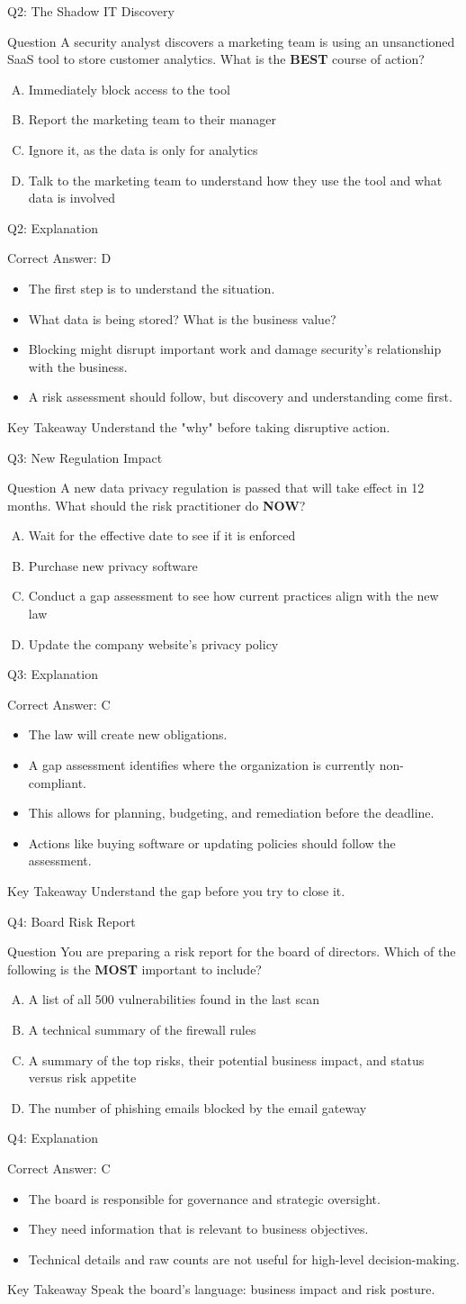 \documentclass[aspectratio=169]{beamer}
\newcommand{\hq}[7]{%
	\begin{frame}{Q#1: #2}
		\begin{block}{Question}
			#3
		\end{block}
		\begin{enumerate}[(A)]
			#4
		\end{enumerate}
	\end{frame}
	\begin{frame}{Q#1: Explanation}
		\begin{block}{Correct Answer: #5}
			\begin{itemize}
				#6
			\end{itemize}
		\end{block}
		\begin{alertblock}{Key Takeaway}
			#7
		\end{alertblock}
	\end{frame}
}
\begin{document}
	\hq{2}{The Shadow IT Discovery}
	{A security analyst discovers a marketing team is using an unsanctioned SaaS tool to store customer analytics. What is the \textbf{BEST} course of action?}
	{\item Immediately block access to the tool
		\item Report the marketing team to their manager
		\item Ignore it, as the data is only for analytics
		\item Talk to the marketing team to understand how they use the tool and what data is involved}
	{D}
	{\item The first step is to understand the situation.
		\item What data is being stored? What is the business value?
		\item Blocking might disrupt important work and damage security's relationship with the business.
		\item A risk assessment should follow, but discovery and understanding come first.}
	{Understand the "why" before taking disruptive action.}
	
	\hq{3}{New Regulation Impact}
	{A new data privacy regulation is passed that will take effect in 12 months. What should the risk practitioner do \textbf{NOW}?}
	{\item Wait for the effective date to see if it is enforced
		\item Purchase new privacy software
		\item Conduct a gap assessment to see how current practices align with the new law
		\item Update the company website's privacy policy}
	{C}
	{\item The law will create new obligations.
		\item A gap assessment identifies where the organization is currently non-compliant.
		\item This allows for planning, budgeting, and remediation before the deadline.
		\item Actions like buying software or updating policies should follow the assessment.}
	{Understand the gap before you try to close it.}
	
	\hq{4}{Board Risk Report}
	{You are preparing a risk report for the board of directors. Which of the following is the \textbf{MOST} important to include?}
	{\item A list of all 500 vulnerabilities found in the last scan
		\item A technical summary of the firewall rules
		\item A summary of the top risks, their potential business impact, and status versus risk appetite
		\item The number of phishing emails blocked by the email gateway}
	{C}
	{\item The board is responsible for governance and strategic oversight.
		\item They need information that is relevant to business objectives.
		\item Technical details and raw counts are not useful for high-level decision-making.}
	{Speak the board's language: business impact and risk posture.}
	
\end{document}
